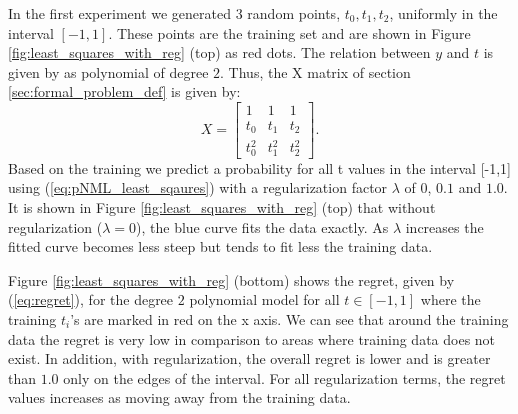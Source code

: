 \documentclass[conference,letterpaper]{IEEEtran}
\begin{document}
In the first experiment we generated 3 random points, $t_0,t_1,t_2$, uniformly in the interval $[-1, 1]$. These points are the training set and are shown in Figure \ref{fig:least_squares_with_reg} (top) as red dots. 
The relation between $y$ and $t$ is given by as polynomial of degree $2$.
Thus, the X matrix of section \ref{sec:formal_problem_def} is given by:
\begin{equation}
X = 
\begin{bmatrix}
1 & 1 & 1 \\
t_0 & t_1 & t_2 \\
t_0^2 & t_1^2 & t_2^2 
\end{bmatrix}.
\end{equation}
Based on the training we predict a probability for all t values in the interval [-1,1] using (\ref{eq:pNML_least_sqaures}) with a regularization factor $\lambda$ of $0$, $0.1$ and $1.0$. 
It is shown in Figure \ref{fig:least_squares_with_reg} (top) that without regularization ($\lambda=0$), the blue curve fits the data exactly. As $\lambda$ increases the fitted curve becomes less steep but tends to fit less the training data.

Figure \ref{fig:least_squares_with_reg} (bottom) shows the regret, given by (\ref{eq:regret}), for the degree $2$ polynomial model for all $t\in[-1,1]$ where the training $t_i$'s are marked in red on the x axis. 
We can see that around the training data the regret is very low in comparison to areas where training data does not exist. 
In addition, with regularization, the overall regret is lower and is greater than $1.0$ only on the edges of the interval.
For all regularization terms, the regret values increases as moving away from the training data.
\end{document}

